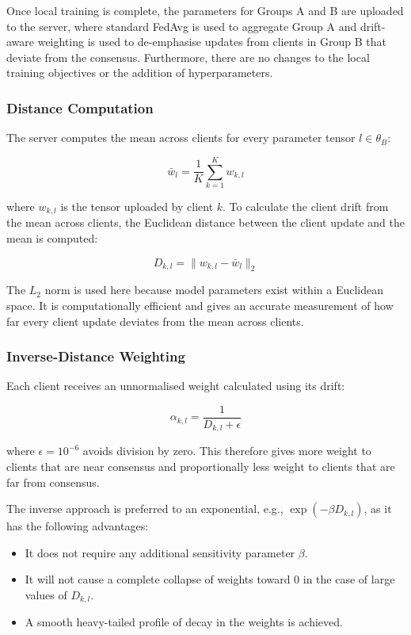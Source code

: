 \documentclass{ieeeaccess}
\begin{document}
Once local training is complete, the parameters for Groups A and B are uploaded to the server, where standard FedAvg is used to aggregate Group A and drift-aware weighting is used to de-emphasise updates from clients in Group B that deviate from the consensus. Furthermore, there are no changes to the local training objectives or the addition of hyperparameters.

\subsubsection{Distance Computation}

The server computes the mean across clients for every parameter tensor $l \in \theta_B$:

\begin{equation}
\label{eq:consensus_mean}
\bar{w}_l = \frac{1}{K} \sum_{k=1}^{K} w_{k,l}
\end{equation}

where $w_{k,l}$ is the tensor uploaded by client $k$. To calculate the client drift from the mean across clients, the Euclidean distance between the client update and the mean is computed:

\begin{equation}
\label{eq:drift_distance}
D_{k,l} = \| w_{k,l} - \bar{w}_l \|_2
\end{equation}

The $L_2$ norm is used here because model parameters exist within a Euclidean space. It is computationally efficient and gives an accurate measurement of how far every client update deviates from the mean across clients.

\subsubsection{Inverse-Distance Weighting}

Each client receives an unnormalised weight calculated using its drift:

\begin{equation}
\label{eq:inv_weight}
\alpha_{k,l} = \frac{1}{D_{k,l} + \epsilon}
\end{equation}

where $\epsilon = 10^{-6}$ avoids division by zero. This therefore gives more weight to clients that are near consensus and proportionally less weight to clients that are far from consensus.

The inverse approach is preferred to an exponential, e.g., $\exp(-\beta D_{k,l})$, as it has the following advantages:
\begin{itemize}
\item It does not require any additional sensitivity parameter $\beta$.
\item It will not cause a complete collapse of weights toward 0 in the case of large values of $D_{k,l}$.
\item A smooth heavy-tailed profile of decay in the weights is achieved.
\end{itemize}
\end{document}
